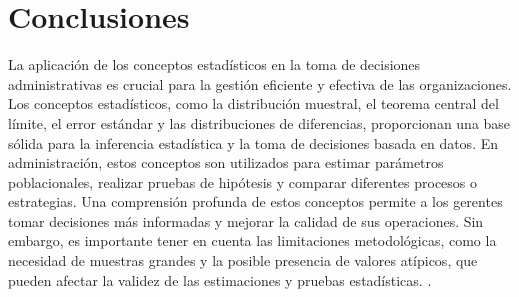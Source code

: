 {\clearpage
\section{Conclusiones}
La aplicación de los conceptos estadísticos en la toma de decisiones administrativas es crucial para la gestión eficiente y efectiva de las organizaciones. Los conceptos estadísticos, como la distribución muestral, el teorema central del límite, el error estándar y las distribuciones de diferencias, proporcionan una base sólida para la inferencia estadística y la toma de decisiones basada en datos. En administración, estos conceptos son utilizados para estimar parámetros poblacionales, realizar pruebas de hipótesis y comparar diferentes procesos o estrategias. Una comprensión profunda de estos conceptos permite a los gerentes tomar decisiones más informadas y mejorar la calidad de sus operaciones. Sin embargo, es importante tener en cuenta las limitaciones metodológicas, como la necesidad de muestras grandes y la posible presencia de valores atípicos, que pueden afectar la validez de las estimaciones y pruebas estadísticas. \citep{anderson2012,lind2012,wackerly2010,diazRodriguez2022}.
}

